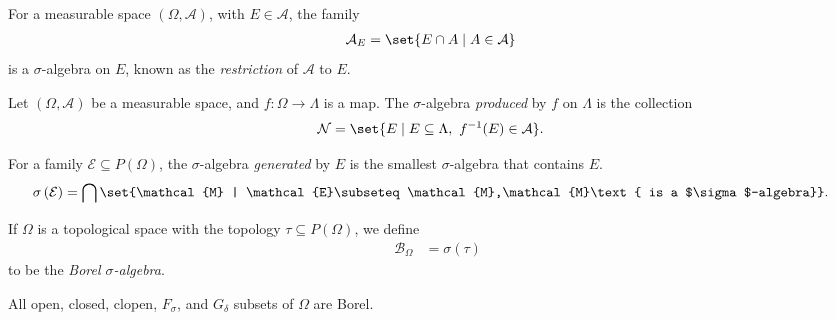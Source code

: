 \begin{definition}
  For a measurable space $\left(\Omega,\mathcal{A}\right)$, with $E\in \mathcal{A}$, the family
  \begin{align*}
    \mathcal{A}_{E} &= \set{E\cap A\mid A\in \mathcal{A}}
  \end{align*}
  is a $\sigma$-algebra on $E$, known as the \textit{restriction} of $\mathcal{A}$ to $E$.
\end{definition}
\begin{definition}
Let $\left(\Omega,\mathcal{A}\right)$ be a measurable space, and $f\colon \Omega\rightarrow \Lambda$ is a map. The $\sigma$-algebra \textit{produced} by $f$ on $\Lambda$ is the collection
\begin{align*}
  \mathcal{N} &= \set{E\mid E\subseteq \Lambda,~f^{-1}(E) \in \mathcal{A}}.
\end{align*}
\end{definition}
\begin{definition}
  For a family $\mathcal{E}\subseteq P\left(\Omega\right)$, the $\sigma$-algebra \textit{generated} by $E$ is the smallest $\sigma$-algebra that contains $E$.
  \begin{align*}
    \sigma\left(\mathcal{E}\right) &= \bigcap\set{\mathcal{M} | \mathcal{E}\subseteq \mathcal{M},\mathcal{M}\text{ is a $\sigma$-algebra}}.
  \end{align*}
\end{definition}
\begin{definition}
  If $\Omega$ is a topological space with the topology $\tau\subseteq P(\Omega)$, we define
  \begin{align*}
    \mathcal{B}_{\Omega} &= \sigma\left(\tau\right)
  \end{align*}
  to be the \textit{Borel $\sigma$-algebra}.
\end{definition}
All open, closed, clopen, $F_{\sigma}$, and $G_{\delta}$ subsets of $\Omega$ are Borel.\break

